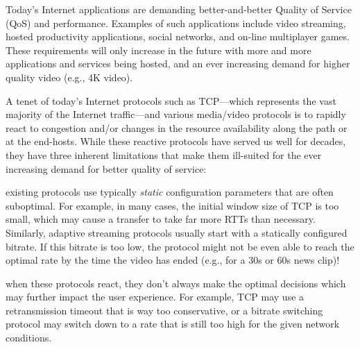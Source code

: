 \label{sec:intro}



Today's Internet applications are demanding better-and-better Quality of Service (QoS) and performance. Examples of such applications include video streaming, hosted productivity applications, social networks, and on-line multiplayer games. These requirements will only increase in the future with more and more applications and services being hosted, and an ever increasing demand for higher quality video (e.g., 4K video).

A tenet of today's Internet protocols such as TCP---which represents the vast majority of the Internet traffic---and various media/video protocols is to rapidly react to congestion and/or changes in the resource availability along the path or at the end-hosts. While these reactive protocols have served us well for decades, they have three inherent limitations that make them ill-suited for the ever increasing demand for better quality of service: 

 existing protocols use typically \emph{static} configuration parameters that are often suboptimal. For example, in many cases, the initial window size of TCP is too small, which may cause a transfer to take far more RTTs than necessary. Similarly, adaptive streaming protocols usually start with a statically configured bitrate. If this bitrate is too low, the protocol might not be even able to reach the optimal rate by the time the video has ended (e.g., for a 30s or 60s news clip)!

 when these protocols react, they don't always make the optimal decisions which may further impact the user experience. For example, TCP may use a retransmission timeout that is way too conservative, or a bitrate switching protocol may switch down to a rate that is still too high for the given network conditions.

